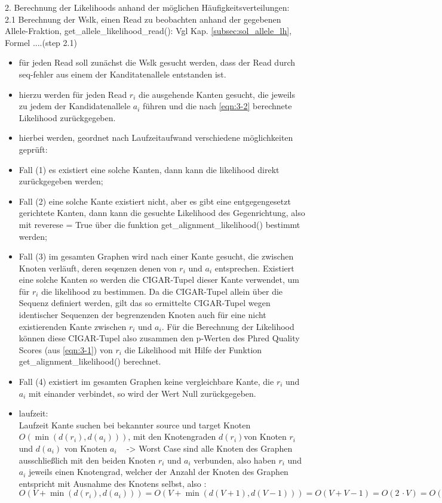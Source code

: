 2. Berechnung der Likelihoods anhand der möglichen Häufigkeitsverteilungen:\\
2.1 Berechnung der Wslk, einen Read zu beobachten anhand der gegebenen Allele-Fraktion, get\_allele\_likelihood\_read(): Vgl Kap. \ref{subsec:sol_allele_lh}, Formel ....(step 2.1)
\begin{itemize}
	\item für jeden Read soll zunächst die Wslk gesucht werden, dass der Read durch seq-fehler aus einem der Kanditatenallele entstanden ist. 
	\item hierzu werden für jeden Read $ r_{i} $ die ausgehende Kanten gesucht, die jeweils zu jedem der Kandidatenallele $ a_{i} $ führen und die nach \eqref{eqn:3-2} berechnete Likelihood zurückgegeben.
	\item hierbei werden, geordnet nach Laufzeitaufwand verschiedene möglichkeiten geprüft: 
	\item Fall (1) es existiert eine solche Kanten, dann kann die likelihood direkt zurückgegeben werden; 
	\item Fall (2) eine solche Kante existiert nicht, aber es gibt eine entgegengesetzt gerichtete Kanten, dann kann die gesuchte Likelihood des Gegenrichtung, also mit reverese = True über die funktion get\_alignment\_likelihood() bestimmt werden; 
	\item Fall (3) im gesamten Graphen wird nach einer Kante gesucht, die zwischen Knoten verläuft, deren seqenzen denen von $ r_{i} $ und $ a_{i} $ entsprechen. Existiert eine solche Kanten so werden die CIGAR-Tupel dieser Kante verwendet, um für $ r_{i} $ die likelihood zu bestimmen. Da die CIGAR-Tupel allein über die Sequenz definiert werden, gilt das so ermittelte CIGAR-Tupel wegen identischer Sequenzen der begrenzenden Knoten auch für eine nicht existierenden Kante zwischen $ r_{i} $ und $ a_{i} $. Für die Berechnung der Likelihood können diese CIGAR-Tupel also zusammen den p-Werten des Phred Quality Scores (aus \eqref{eqn:3-1}) von $ r_{i} $ die Likelihood mit Hilfe der Funktion get\_alignment\_likelihood() berechnet. 
	\item Fall (4) existiert im gesamten Graphen keine vergleichbare Kante, die $ r_{i} $ und $ a_{i} $ mit einander verbindet, so wird der Wert Null zurückgegeben.
	\item laufzeit:\\	 
	 Laufzeit Kante suchen bei bekannter source und target Knoten $O(\min (d(r_{i}), d(a_{i})))$, mit den Knotengraden $d(r_{i}) $von Knoten $r_{i}$ und $d(a_{i}) $ von Knoten $a_{i}$ ~\cite{docs_graph_tool} -> Worst Case sind alle Knoten des Graphen ausschließlich mit den beiden Knoten $r_{i}$ und $a_{i}$ verbunden, also haben $r_{i}$ und $a_{i}$ jeweils einen Knotengrad, welcher der Anzahl der Knoten des Graphen entspricht mit Ausnahme des Knotens selbst, also : $O(V+\min (d(r_{i}), d(a_{i}))) = O(V+\min (d(V+1), d(V-1))) = O(V+V-1) = O(2 \, \cdotp V) = O(V)$ \\

\end{itemize}
